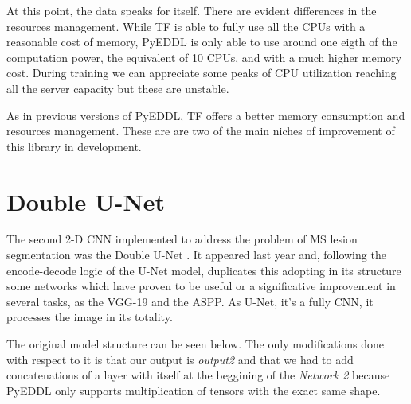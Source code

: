 At this point, the data speaks for itself. There are evident differences in the resources management. While TF is able to fully use all the CPUs with a reasonable cost of memory, PyEDDL is only able to use around one eigth of the computation power, the equivalent of 10 CPUs, and with a much higher memory cost. During training we can appreciate some peaks of CPU utilization reaching all the server capacity but these are unstable.

As in previous versions of PyEDDL, TF offers a better memory consumption and resources management. These are are two of the main niches of improvement of this library in development.




\newpage
\section{Double U-Net}

The second 2-D CNN implemented to address the problem of MS lesion segmentation was the Double U-Net \cite{DOUBLE_UNET:2020}. It appeared last year and, following the encode-decode logic of the U-Net model, duplicates this adopting in its structure some networks which have proven to be useful or a significative improvement in several tasks, as the VGG-19 and the ASPP. %
As U-Net, it's a fully CNN, it processes the image in its totality. 

The original model structure can be seen below. The only modifications done with respect to it is that our output is \textit{output2} and that we had to add concatenations of a layer with itself at the beggining of the \textit{Network 2} because PyEDDL only supports multiplication of tensors with the exact same shape.

